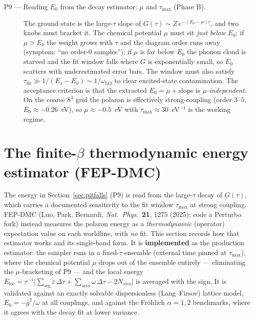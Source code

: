 \documentclass[11pt]{article}
\begin{document}
\begin{description}
  \item[P9 --- Reading $E_{0}$ from the decay estimator: $\mu$ and $\tau_{\max}$ (Phase B).]
    The ground state is the large-$\tau$ slope of $G(\tau)\sim Z\,e^{-(E_{0}-\mu)\tau}$, and
    two knobs must bracket it. The chemical potential $\mu$ must sit \emph{just below}
    $E_{0}$: if $\mu>E_{0}$ the weight grows with $\tau$ and the diagram order runs away
    (symptom: ``no order-$0$ samples''); if $\mu$ is far below $E_{0}$ the phonon cloud is
    starved and the fit window falls where $G$ is exponentially small, so $E_{0}$ scatters
    with underestimated error bars. The window must also satisfy
    $\tau_{\mathrm{fit}}\gg1/(E_{1}{-}E_{0})\sim1/\omega_{\mathrm{LO}}$ to clear
    excited-state contamination. The acceptance criterion is that the extracted
    $E_{0}=\mu+\text{slope}$ is \emph{$\mu$-independent}. On the coarse $8^{3}$ grid the
    polaron is effectively strong-coupling (order $3$--$5$, $E_{0}\approx-0.26$~eV), so
    $\mu\approx-0.5$~eV with $\tau_{\max}\approx30$~eV$^{-1}$ is the working regime.
\end{description}

\section{The finite-$\beta$ thermodynamic energy estimator (FEP-DMC)}
\label{sec:thermo-estimator}

The energy in Section~\ref{sec:pitfalls} (P9) is read from the large-$\tau$ decay
of $G(\tau)$, which carries a documented sensitivity to the fit window $\tau_{\max}$
at strong coupling. FEP-DMC (Luo, Park, Bernardi, \emph{Nat.\ Phys.}\ \textbf{21}, 1275
(2025); code a Perturbo fork) instead measures the polaron energy as a
\emph{thermodynamic} (operator) expectation value on each worldline, with \emph{no}
fit. This section records how that estimator works and its single-band form. It is
\textbf{implemented} as the production estimator: the sampler runs in a fixed-$\tau$
ensemble (external time pinned at $\tau_{\max}$), where the chemical potential $\mu$
drops out of the ensemble entirely --- eliminating the $\mu$-bracketing of P9 --- and the
local energy $E_{\mathrm{loc}}=\tau^{-1}\bigl[\sum_{\mathrm{seg}}\varepsilon\,\Delta\tau
+\sum_{\mathrm{arcs}}\omega\,\Delta\tau-2N_{\mathrm{arcs}}\bigr]$ is averaged with the
sign. It is validated against an exactly solvable dispersionless (Lang--Firsov) lattice
model, $E_{0}=-\bar{g}^{2}/\omega$ at all couplings, and against the Fr\"ohlich
$\alpha=1,2$ benchmarks, where it agrees with the decay fit at lower variance.
\end{document}
